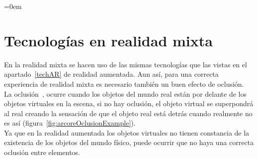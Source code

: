 \parindent=0em
\section{Tecnologías en realidad mixta}
\label{sec:oclusion}
\noindent

En la realidad mixta se hacen uso de las mismas tecnologías que las vistas en el apartado~\ref{techAR} de realidad aumentada. Aun así, para una correcta experiencia de realidad mixta es necesario también un buen efecto de oclusión.\\

La oclusión~\cite{oclussionExplanationEstadoDelArte}, ocurre cuando los objetos del mundo real están por delante de los objetos virtuales en la escena, si no hay oclusión, el objeto virtual se superpondrá al real creando la sensación de que el objeto real está detrás cuando realmente no es así (figura~\ref{fig:arcoreOclusionExample}).\\

Ya que en la realidad aumentada los objetos virtuales no tienen constancia de la existencia de los objetos del mundo físico, puede ocurrir que no haya una correcta oclusión entre elementos.\\

